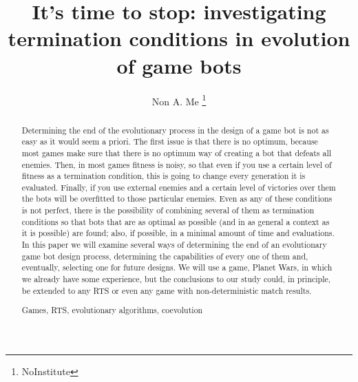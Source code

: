 \documentclass[runningheads,a4paper]{llncs}
\newcommand{\keywords}[1]{\par\addvspace\baselineskip
\noindent\keywordname\enspace\ignorespaces#1}
\begin{document}
\mainmatter  %

\title{It's time to stop: investigating termination conditions in evolution of game bots}


%
%
\author{Non A. Me%
\thanks{NoInstitute}}
%


%
%

\maketitle


\begin{abstract}
Determining the end of the evolutionary process in the design of a
game bot is not as easy as it would seem a priori. The first issue is
that there is no optimum, because most games make sure that there is
no optimum way of creating a bot that defeats all enemies. Then, in
most games fitness is noisy, so that even if you use a certain level
of fitness as a termination condition, this is going to change every
generation it is evaluated. Finally, if you use external enemies and a
certain level of victories over them the bots will be overfitted to
those particular enemies. Even as any of these conditions is not
perfect, there is the possibility of combining several of them as
termination conditions so that bots that are as optimal as possible
(and in as general a context as it is possible) are found; also, if
possible, in a minimal amount of time and evaluations. In this paper
we will examine several ways of determining the end of an evolutionary
game bot design process, determining the capabilities of every one of
them and, eventually, selecting one for future designs. We will use a
game, Planet Wars, in which we already have some experience, but the
conclusions to our study could, in principle, be extended to any RTS
or even any game with non-deterministic match results. 
\keywords{Games, RTS, evolutionary algorithms, coevolution}
\end{abstract}
\end{document}
